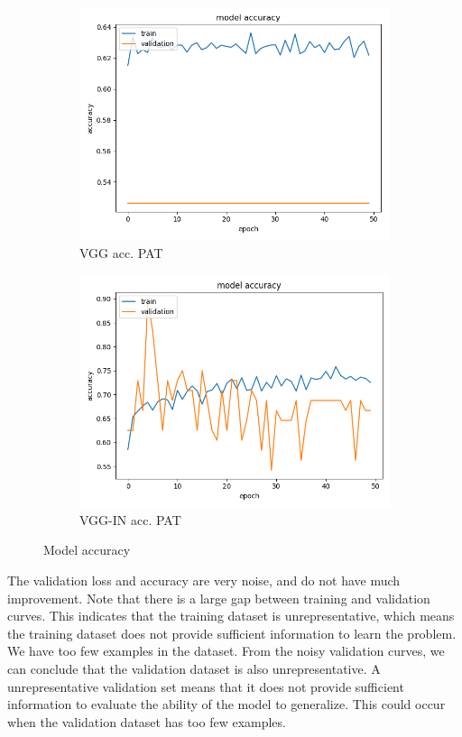\begin{figure}[h]
\begin{subfigure}[b]{.24\linewidth}
\includegraphics[width=\linewidth]{Figs/vgg_pat_acc.jpg}
\caption{VGG acc. PAT}
\end{subfigure}
\begin{subfigure}[b]{.25\linewidth}
\includegraphics[width=\linewidth]{Figs/vgg_in_pat_acc.jpg}
\caption{VGG-IN acc. PAT}
\end{subfigure}
\caption{Model accuracy}
\label{fig:acc}
\end{figure}

The validation loss and accuracy are very noise, and do not have much improvement. Note that there is a large gap between training and validation curves. This indicates that the training dataset is unrepresentative, which means the training dataset does not provide sufficient information to learn the problem. We have too few examples in the dataset. From the noisy validation curves, we can conclude that the validation dataset is also unrepresentative. A  unrepresentative validation set means that it does not provide sufficient information to evaluate the ability of the model to generalize. This could occur when the validation dataset has too few examples.


